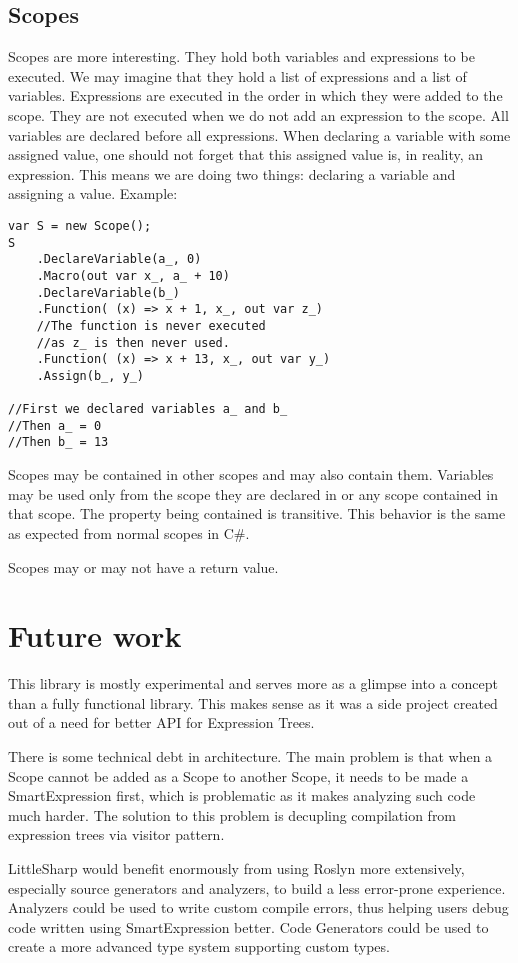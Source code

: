 \subsection{Scopes}
Scopes are more interesting. They hold both variables and expressions to be executed. We may imagine that they hold a list of expressions and a list of variables. Expressions are executed in the order in which they were added to the scope. They are not executed when we do not add an expression to the scope. All variables are declared before all expressions. When declaring a variable with some assigned value, one should not forget that this assigned value is, in reality, an expression. This means we are doing two things: declaring a variable and assigning a value. Example: 
\begin{lstlisting}
var S = new Scope();
S
    .DeclareVariable(a_, 0)
    .Macro(out var x_, a_ + 10)
    .DeclareVariable(b_)
    .Function( (x) => x + 1, x_, out var z_)
    //The function is never executed
    //as z_ is then never used.
    .Function( (x) => x + 13, x_, out var y_)
    .Assign(b_, y_)

//First we declared variables a_ and b_
//Then a_ = 0
//Then b_ = 13
\end{lstlisting}

Scopes may be contained in other scopes and may also contain them. Variables may be used only from the scope they are declared in or any scope contained in that scope. The property being contained is transitive. This behavior is the same as expected from normal scopes in C\#.

Scopes may or may not have a return value. 


\section{Future work}
This library is mostly experimental and serves more as a glimpse into a concept than a fully functional library. This makes sense as it was a side project created out of a need for better API for Expression Trees. 

There is some technical debt in architecture. The main problem is that when a Scope cannot be added as a Scope to another Scope, it needs to be made a SmartExpression first, which is problematic as it makes analyzing such code much harder. The solution to this problem is decupling compilation from expression trees via visitor pattern.

LittleSharp would benefit enormously from using Roslyn more extensively, especially source generators and analyzers, to build a less error-prone experience. Analyzers could be used to write custom compile errors, thus helping users debug code written using SmartExpression better. Code Generators could be used to create a more advanced type system supporting custom types.


